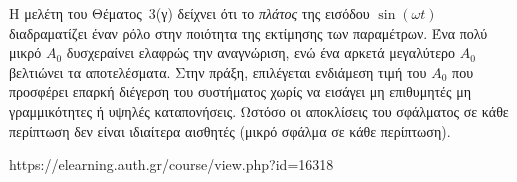 \documentclass[a4paper,12pt]{report}
\newcommand{\en}{\selectlanguage{english}}
\begin{document}
Η μελέτη του Θέματος~3(γ) δείχνει ότι το \emph{πλάτος} της εισόδου \(\sin(\omega t)\) διαδραματίζει έναν ρόλο στην ποιότητα της εκτίμησης των παραμέτρων. Ένα πολύ μικρό \(A_0\) δυσχεραίνει ελαφρώς την αναγνώριση, ενώ ένα αρκετά μεγαλύτερο \(A_0\) βελτιώνει τα αποτελέσματα. Στην πράξη, επιλέγεται ενδιάμεση τιμή του \(A_0\) που προσφέρει επαρκή διέγερση του συστήματος χωρίς να εισάγει μη επιθυμητές μη γραμμικότητες ή υψηλές καταπονήσεις. Ωστόσο οι αποκλίσεις του σφάλματος σε κάθε περίπτωση δεν είναι ιδιαίτερα αισθητές (μικρό σφάλμα σε κάθε περίπτωση). 



\begin{thebibliography}{1}
    \en https://elearning.auth.gr/course/view.php?id=16318
\end{thebibliography}
\end{document}

